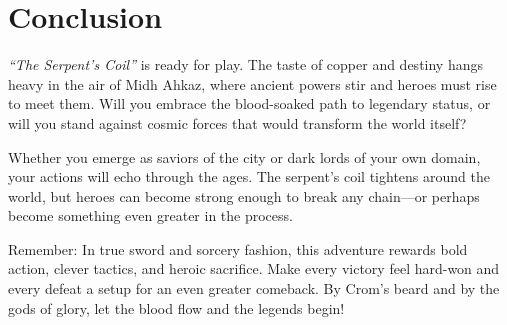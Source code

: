 \documentclass[11pt]{article}
\begin{document}
\section*{Conclusion}

\textit{“The Serpent's Coil”} is ready for play. The taste of copper and destiny hangs heavy in the air of Midh Ahkaz, where ancient powers stir and heroes must rise to meet them. Will you embrace the blood-soaked path to legendary status, or will you stand against cosmic forces that would transform the world itself?

Whether you emerge as saviors of the city or dark lords of your own domain, your actions will echo through the ages. The serpent's coil tightens around the world, but heroes can become strong enough to break any chain—or perhaps become something even greater in the process.

Remember: In true sword and sorcery fashion, this adventure rewards bold action, clever tactics, and heroic sacrifice. Make every victory feel hard-won and every defeat a setup for an even greater comeback. By Crom's beard and by the gods of glory, let the blood flow and the legends begin!
\end{document}
